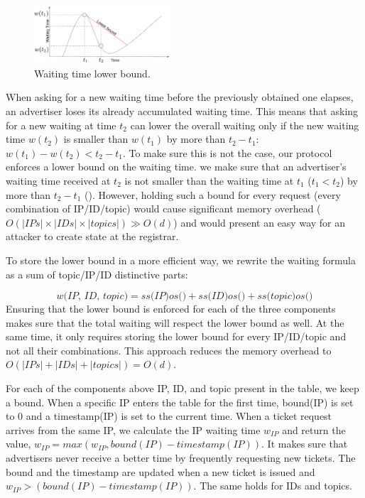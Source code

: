 \begin{figure}
    \includegraphics[width=0.45\textwidth]{img/lower_bound.png}
    \caption{Waiting time lower bound.}
    \label{fig:lower_bound}
\end{figure}

When asking for a new waiting time before the previously obtained one elapses,
an advertiser loses its already accumulated waiting time. This means that
asking for a new waiting at time $t_2$ can lower the overall waiting only if
the new waiting time $w(t_2)$ is smaller than $w(t_1)$ by more than $t_2 - t_1$: $w(t_1) - w(t_2) < t_2 - t_1$.
To make sure this is not the case, our protocol enforces a lower bound on the
waiting time. \Ie we make sure that an advertiser's waiting time received at
$t_2$ is not smaller than the waiting time at $t_1$ ($t_1 < t_2$) by more than
$t_2 - t_1$ ().
However, holding such a bound for every request (\ie every combination of IP/ID/topic) would cause significant memory overhead ($O(|IPs|\times|IDs|\times|topics|)  \gg O(d)$) and would present an easy way for an attacker to create state at the registrar. 

To store the lower bound in a more efficient way, we rewrite the waiting formula as a sum of topic/IP/ID distinctive parts:

\begin{equation}
    \textit{w(IP, ID, topic)} = 
    \textit{ss(IP)}\textit{os()} + 
    \textit{ss(ID)}\textit{os()} + 
    \textit{ss(topic)}\textit{os()}
\end{equation}
Ensuring that the lower bound is enforced for each of the three components
makes sure that the total waiting will respect the lower bound as well. At the
same time, it only requires storing the lower bound for every IP/ID/topic and not all their combinations. This approach reduces the memory overhead to $O(|IPs|+|IDs|+|topics|) = O(d)$.

For each of the components above IP, ID, and topic present in the table, we
keep a bound. When a specific IP enters the table for the first time, bound(IP)
is set to 0 and a timestamp(IP) is set to the current time. When a ticket
request arrives from the same IP, we calculate the IP waiting time $w_{IP}$ and
return the value, $w_{IP} = max(w_{IP}, bound(IP) - timestamp(IP))$. It makes sure that advertisers never receive a better time by frequently requesting new tickets. The bound and the timestamp are updated when a new ticket is issued and $w_{IP} > (bound(IP) - timestamp(IP))$. The same holds for IDs and topics.


